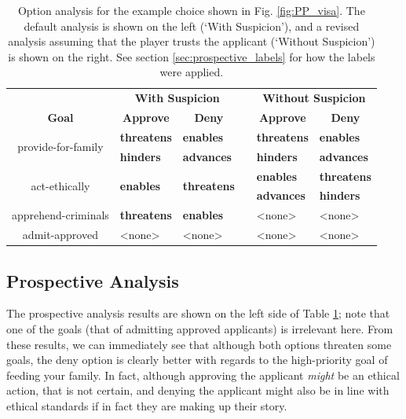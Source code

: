 \documentclass[arts,article,submit,moreauthors,pdftex,10pt,a4paper]{Definitions/mdpi}
\newcommand{\enables}{\textbf{\color{enables}enables}}
\newcommand{\advances}{\textbf{\color{advances}advances}}
\newcommand{\threatens}{\textbf{\color{threatens}threatens}}
\newcommand{\hinders}{\textbf{\color{hinders}hinders}}
\providecommand{\DIFadd}[1]{{\protect\color{blue}\uwave{#1}}} %
\providecommand{\DIFaddbegin}{} %
\providecommand{\DIFaddend}{} %
\providecommand{\DIFaddbeginFL}{} %
\providecommand{\DIFaddendFL}{} %
\providecommand{\DIFdelbeginFL}{} %
\providecommand{\DIFdelendFL}{} %
\begin{document}
\begin{table}[H]
\centering
\begin{tabular}{c l l l l l}
  \toprule
  & \multicolumn{2}{c}{\textbf{With Suspicion}} && \multicolumn{2}{c}{\textbf{Without Suspicion}} \\
  \cmidrule(r){1-1} \cmidrule{2-3} \cmidrule{5-6}
  \textbf{Goal} & \multicolumn{1}{c}{\textbf{Approve}} & \multicolumn{1}{c}{\textbf{Deny}} && \multicolumn{1}{c}{\textbf{Approve}} & \multicolumn{1}{c}{\textbf{Deny}} \\
  \cmidrule(r){1-1} \cmidrule{2-3} \cmidrule{5-6}
  \multirow{2}{9em}{\centering provide-for-family} & \threatens{} & \enables{} && \threatens{} & \enables{} \\
                                        & \hinders{} & \advances{} && \hinders{} & \advances{} \\
  \cmidrule(r){1-1} \cmidrule{2-3} \cmidrule{5-6}
  \multirow{2}{9em}{\centering act-ethically} & \multirow{2}{6em}{\enables{}} & \multirow{2}{6em}{\threatens{}} && \enables{} & \threatens{} \\
  & & && \advances{} & \hinders{} \\
  \cmidrule(r){1-1} \cmidrule{2-3} \cmidrule{5-6}
  apprehend-criminals & \threatens{} & \enables{} && <none> & <none> \\
  \cmidrule(r){1-1} \cmidrule{2-3} \cmidrule{5-6}
  admit-approved & <none> & <none> && <none> & <none> \\
  \bottomrule
\end{tabular}
  \DIFdelbeginFL %
\DIFdelendFL \DIFaddbeginFL \caption[\emph{Papers, Please} option analysis]{\DIFaddendFL Option analysis for the example choice shown in Fig. \ref{fig:PP_visa}. The default analysis is shown on the left (`With Suspicion'), and a revised analysis assuming that the player trusts the applicant (`Without Suspicion') is shown on the right. See section \ref{sec:prospective_labels} for how the labels were applied.}
\label{tab:PP_options}
\end{table}

\subsection{Prospective Analysis}

The prospective analysis results are shown on the left side of Table \ref{tab:PP_options}; note that one of the goals (that of admitting approved applicants) is irrelevant here.
%
From these results, we can immediately see that although both options threaten some goals, the deny option is clearly better with regards to the high-priority goal of feeding your family.
%
In fact, although approving the applicant \emph{might} be an ethical action, that is not certain, and denying the applicant might also be in line with \DIFaddbegin \DIFadd{our player model's }\DIFaddend ethical standards if in fact they are making up their story.
\end{document}
